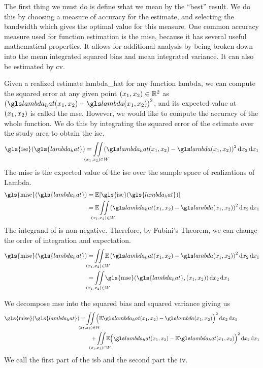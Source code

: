 The first thing we must do is define what we mean by the ``best'' result.
We do this by choosing a measure of accuracy for the estimate,
and selecting the bandwidth which gives the optimal value for this measure.
One common accuracy measure used for function estimation is the \gls{mise},
because it has several useful mathematical properties.
It allows for additional analysis by being broken down into the mean integrated squared bias and mean integrated variance.
It can also be estimated by \acrlong{cv}.

Given a realized estimate \gls{lambda_hat} for any function \gls{lambda},
we can compute the squared error at any given point $(x_1, x_2) \in \mathbb{R}^2$ as
$\left( \lmbdhat - \lmbd \right)^2$,
and its expected value at $(x_1, x_2)$ is called the \gls{mse}.
However,
we would like to compute the accuracy of the whole function.
We do this by integrating the squared error of the estimate over the study area to obtain the \gls{ise}.
\begin{equation}
\label{eq:ise}
    \mbox{\gls{ise}}(\gls{lambda_hat}) = \iintW{
            \left( \lmbdhat - \lmbd \right)^2
    }
\end{equation}
The \gls{mise} is the expected value of the \gls{ise} over the sample space of realizations of \gls{Lambda}.
\begin{align}
    \mbox{\gls{mise}}(\gls{lambda_hat}) 
        & = \E [\mbox{\gls{ise}}(\gls{lambda_hat})] \nonumber \\
        & = \E \iintW{ \left( \lmbdhat - \lmbd \right)^2 } \label{eq:mise}
\end{align}
The integrand of  is non-negative.
Therefore, by Fubini's Theorem, we can change the order of integration and expectation.
\begin{align}
    \mbox{\gls{mise}}(\gls{lambda_hat}) 
        & = \iintW{ \E \left( \lmbdhat - \lmbd \right)^2 } \nonumber \\
        & = \iintW{ \mbox{\gls{mse}}(\gls{lambda_hat}, \xvec) } \nonumber
\end{align}

We decompose \gls{mse} into the squared bias and squared variance%
giving us
\begin{align}
    \mbox{\gls{mise}}(\gls{lambda_hat}) 
        & = \iintW{ \Big( \E\lmbdhat - \lmbd \Big)^2 } \nonumber \\
        & \qquad + \iintW{ \E \Big( \lmbdhat - \E\lmbdhat \Big)^2 } \label{eq:mise:intbiasvariance}
\end{align}
We call the first part of  the \gls{isb} and the second part the \gls{iv}.

